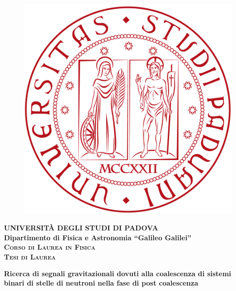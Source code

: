 \documentclass[a4paper,11pt]{book}
\begin{document}
	
	\frontmatter
	\begin{titlepage}
		\vspace{5mm}
		\begin{figure}[hbtp]
			\centering
			\includegraphics[scale=.13]{UNIPD.png}
		\end{figure}
		
		\vspace{5mm}
		
		\begin{center}
			{{\huge{\textsc{\bf UNIVERSIT\`A DEGLI STUDI DI PADOVA}}}\\}
			\vspace{5mm}
			{\Large{\bf Dipartimento di Fisica e Astronomia ``Galileo Galilei''}} \\
			\vspace{5mm}
			{\Large{\textsc{\bf Corso di Laurea in Fisica}}}\\
			\vspace{20mm}
			{\Large{\textsc{\bf Tesi di Laurea}}}\\
			\vspace{30mm}
			\begin{spacing}{3}
				{\LARGE \textbf{Ricerca di segnali gravitazionali dovuti alla coalescenza di sistemi binari di stelle di neutroni nella fase di post coalescenza}}\\
			\end{spacing}
			\vspace{8mm}
		\end{center}
		

\end{titlepage}
\end{document}
